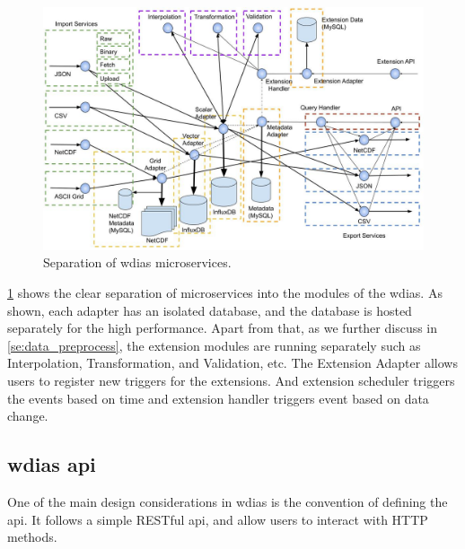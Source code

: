 \begin{figure}[htp]
    \centering
    \includegraphics[width=1\textwidth]{method/microservice/separation_microservices-v3.jpg}
    \caption{Separation of \acrshort{wdias} microservices.}
    \label{fi:wdias_micro_separation}
\end{figure}
\cref{fi:wdias_micro_separation} shows the clear separation of microservices into the modules of the \acrshort{wdias}. As shown, each adapter has an isolated database, and the database is hosted separately for the high performance. 
Apart from that, as we further discuss in \cref{se:data_preprocess}, the extension modules are running separately such as Interpolation, Transformation, and Validation, etc. 
The Extension Adapter allows users to register new triggers for the extensions. And extension scheduler triggers the events based on time and extension handler triggers event based on data change.


\subsection{\acrshort{wdias} \acrfull{api}}
\label{sebse:wdias_api}
One of the main design considerations in \acrshort{wdias} is the convention of defining the \acrshort{api}. It follows a simple RESTful \acrshort{api}, and allow users to interact with HTTP methods.


